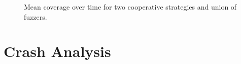 \begin{figure}[h]
\begin{adjustbox}{center}
{            \label{fig:eval-coop-tiff2pdf}
        }
    \end{adjustbox}
    \caption{Mean coverage over time for two cooperative strategies and union of
    fuzzers.}
    \label{fig:eval-coop}
\end{figure}

\section{Crash Analysis}

